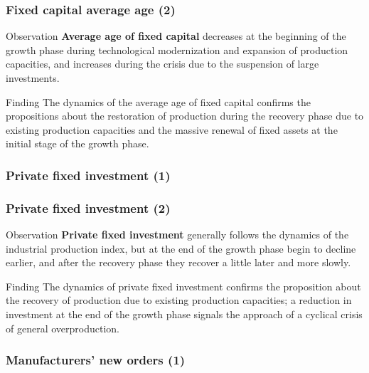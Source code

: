 \begin{frame}
  \frametitle{Fixed capital average age (2)}
  \begin{block}{Observation}
    \textbf{Average age of fixed capital} decreases at the beginning of the growth phase during technological modernization and expansion of production capacities, and increases during the crisis due to the suspension of large investments.
  \end{block}

  \begin{alertblock}{Finding}
    The dynamics of the average age of fixed capital confirms the propositions about the restoration of production during the recovery phase due to existing production capacities and the massive renewal of fixed assets at the initial stage of the growth phase.
  \end{alertblock}
\end{frame}

\begin{frame}[t]
  \frametitle{Private fixed investment (1)}
  \begin{center}
  \end{center}
\end{frame}

\begin{frame}
  \frametitle{Private fixed investment (2)}
  \begin{block}{Observation}
    \textbf{Private fixed investment} generally follows the dynamics of the industrial production index, but at the end of the growth phase begin to decline earlier, and after the recovery phase they recover a little later and more slowly.
  \end{block}

  \begin{alertblock}{Finding}
    The dynamics of private fixed investment confirms the proposition about the recovery of production due to existing production capacities; a reduction in investment at the end of the growth phase signals the approach of a cyclical crisis of general overproduction.
  \end{alertblock}
\end{frame}

\begin{frame}[t]
  \frametitle{Manufacturers' new orders (1)}
  \begin{center}
  \end{center}
\end{frame}

